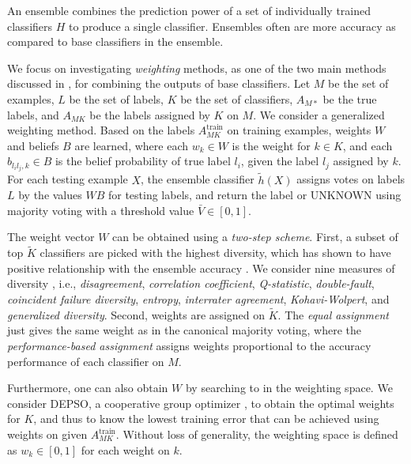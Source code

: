 An ensemble combines the prediction power of a set of individually trained classifiers $H$ to produce a single classifier. Ensembles often are more accuracy as compared to base classifiers in the ensemble. %

We focus on investigating \emph{weighting} methods, as one of the two main methods discussed in \cite{rokach2010ensemble}, for combining the outputs of base classifiers. Let $M$ be the set of examples, $L$ be the set of labels, $K$ be the set of classifiers, $A_{M*}$ be the true labels, and $A_{MK}$ be the labels assigned by $K$ on $M$. We consider a generalized weighting method. Based on the labels $A_{MK}^\text{train}$ on training examples, weights $W$ and beliefs $B$ are learned, where each $w_k \in W$ is the weight for $k\in K$, and each $b_{l_il_j,k} \in B$ is the belief probability of true label $l_i$, given the label $l_j$ assigned by $k$. For each testing example $X$, the ensemble classifier $\tilde{h}(X)$ assigns votes on labels $L$ by the values $WB$ for testing labels, and return the label or UNKNOWN using majority voting with a threshold value $\bar{V} \in [0, 1]$. 

The weight vector $W$ can be obtained using a \emph{two-step scheme}. First, a subset of top $\tilde{K}$ classifiers are picked with the highest diversity, which has shown to have positive relationship with the ensemble accuracy \cite{kuncheva2003measures}. We consider nine measures of diversity \cite{kuncheva2003measures}, i.e., \emph{disagreement}, \emph{correlation coefficient}, \emph{Q-statistic}, \emph{double-fault}, \emph{coincident failure diversity}, \emph{entropy}, \emph{interrater agreement}, \emph{Kohavi-Wolpert}, and \emph{generalized diversity}. Second, weights are assigned on $\tilde{K}$. The \emph{equal assignment} just gives the same weight as in the canonical majority voting, where the \emph{performance-based assignment} \cite{opitz1996generating} assigns weights proportional to the accuracy performance of each classifier on $M$.

Furthermore, one can also obtain $W$ by searching to in the weighting space. We consider DEPSO, a cooperative group optimizer \cite{xie2014cooperative}, to obtain the optimal weights for $K$, and thus to know the lowest training error that can be achieved using weights on given $A_{MK}^\text{train}$. Without loss of generality, the weighting space is defined as $w_k\in [0, 1]$ for each weight on $k$. 


